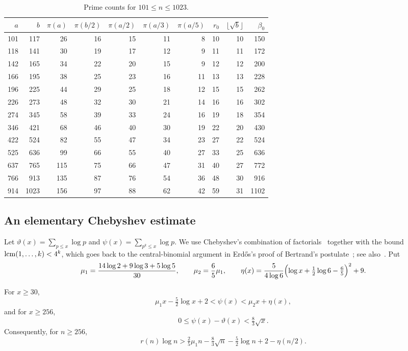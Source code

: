 \begin{table}[ht]
\centering\small
\caption{Prime counts for $101\le n\le1023$.}\label{tab:low-range}
\setlength{\tabcolsep}{4pt}
\begin{tabular}{rr|rrrrr|rrr}
\toprule
$a$&$b$&$\pi(a)$&$\pi(b/2)$&$\pi(a/2)$&$\pi(a/3)$&$\pi(a/5)$&$r_0$&$\lfloor\sqrt b\rfloor$&$\beta_0$\\\midrule
101&117&26&16&15&11&8&10&10&150\\
118&141&30&19&17&12&9&11&11&172\\
142&165&34&22&20&15&9&12&12&200\\
166&195&38&25&23&16&11&13&13&228\\
196&225&44&29&25&18&12&15&15&262\\
226&273&48&32&30&21&14&16&16&302\\
274&345&58&39&33&24&16&19&18&354\\
346&421&68&46&40&30&19&22&20&430\\
422&524&82&55&47&34&23&27&22&524\\
525&636&99&66&55&40&27&33&25&636\\
637&765&115&75&66&47&31&40&27&772\\
766&913&135&87&76&54&36&48&30&916\\
914&1023&156&97&88&62&42&59&31&1102\\\bottomrule
\end{tabular}
\end{table}

\subsection{An elementary Chebyshev estimate}
Let $\vartheta(x)=\sum_{p\le x}\log p$ and $\psi(x)=\sum_{p^k\le x}\log p$. We use Chebyshev's combination of factorials~\cite{Chebyshev} together with the bound $\operatorname{lcm}(1,\dots,k)<4^k$, which goes back to the central-binomial argument in Erd\H{o}s's proof of Bertrand's postulate~\cite{Erdos}; see also~\cite{Hanson,Nair}. Put
\[
 \mu_1=\frac{14\log2+9\log3+5\log5}{30},\qquad \mu_2=\frac65\mu_1,\qquad
 \eta(x)=\frac{5}{4\log6}\Bigl(\log x+\tfrac12\log6-\tfrac65\Bigr)^2+9 .
\]

\begin{lemma}\label{lem:chebyshev}
For $x\ge30$,
\[
 \mu_1x-\tfrac52\log x+2<\psi(x)<\mu_2x+\eta(x),
\]
and for $x\ge256$,
\[
 0\le\psi(x)-\vartheta(x)<\tfrac83\sqrt x .
\]
Consequently, for $n\ge256$,
\begin{equation}\label{eq:rlogn}
 r(n)\log n>\tfrac25\mu_1n-\tfrac83\sqrt n-\tfrac52\log n+2-\eta(n/2).
\end{equation}
\end{lemma}

